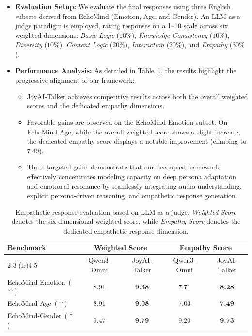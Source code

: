 \begin{itemize}
    \item \textbf{Evaluation Setup:} We evaluate the final responses using three English subsets derived from EchoMind (Emotion, Age, and Gender). An LLM-as-a-judge paradigm is employed, rating responses on a 1--10 scale across six weighted dimensions: \textit{Basic Logic} ($10\%$), \textit{Knowledge Consistency} ($10\%$), \textit{Diversity} ($10\%$), \textit{Content Logic} ($20\%$), \textit{Interaction} ($20\%$), and \textit{Empathy} ($30\%$).
    
    \item \textbf{Performance Analysis:} As detailed in Table~\ref{tab:empathy_response}, the results highlight the progressive alignment of our framework:
    \begin{itemize}
        \item JoyAI-Talker achieves competitive results across both the overall weighted scores and the dedicated empathy dimensions.
        \item Favorable gains are observed on the EchoMind-Emotion subset. On EchoMind-Age, while the overall weighted score shows a slight increase, the dedicated empathy score displays a notable improvement (climbing to $7.49$).
        \item These targeted gains demonstrate that our decoupled framework effectively concentrates modeling capacity on deep persona adaptation and emotional resonance by seamlessly integrating audio understanding, explicit persona-driven reasoning, and empathetic response generation.
    \end{itemize}
\end{itemize}


\begin{table}[ht]
\centering
\small
\caption{Empathetic-response evaluation based on LLM-as-a-judge. \textit{Weighted Score} denotes the six-dimensional weighted score, while \textit{Empathy Score} denotes the dedicated empathetic-response dimension.}
\label{tab:empathy_response}
\begin{tabular}{l cc cc}
\toprule
\multirow{2}{*}{Benchmark} & 
\multicolumn{2}{c}{Weighted Score} &
\multicolumn{2}{c}{Empathy Score} \\
\cmidrule(lr){2-3} \cmidrule(lr){4-5}
& Qwen3-Omni & JoyAI-Talker & Qwen3-Omni & JoyAI-Talker \\
\midrule
EchoMind-Emotion~($\uparrow$) & 8.91 & \textbf{9.38} & 7.71 & \textbf{8.28} \\
EchoMind-Age~($\uparrow$) & 8.91 & \textbf{9.08} & 7.03 & \textbf{7.49} \\
EchoMind-Gender~($\uparrow$) & 9.47 & \textbf{9.79} & 9.20 & \textbf{9.73} \\
\bottomrule
\end{tabular}
\end{table}







